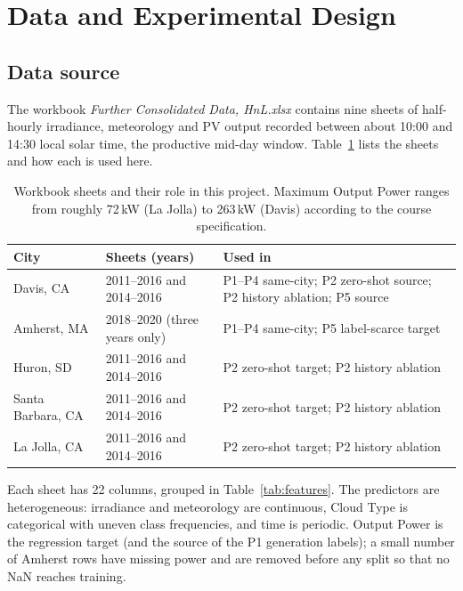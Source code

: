 \documentclass[11pt,letterpaper]{article}
\begin{document}
\section{Data and Experimental Design}
\subsection{Data source}
The workbook \emph{Further Consolidated Data, HnL.xlsx} contains nine sheets of half-hourly
irradiance, meteorology and PV output recorded between about 10:00 and 14:30 local solar time,
the productive mid-day window. Table~\ref{tab:sheets} lists the sheets and
how each is used here.

\begin{table}[!htbp]\centering\footnotesize
\caption{Workbook sheets and their role in this project. Maximum Output Power ranges from roughly 72\,kW (La Jolla) to 263\,kW (Davis) according to the course specification.}\label{tab:sheets}
\setlength{\tabcolsep}{5pt}
\begin{tabularx}{\textwidth}{@{}llX@{}}\toprule
\textbf{City} & \textbf{Sheets (years)} & \textbf{Used in}\\\midrule
Davis, CA & 2011--2016 and 2014--2016 & P1--P4 same-city; P2 zero-shot source; P2 history ablation; P5 source\\
Amherst, MA & 2018--2020 (three years only) & P1--P4 same-city; P5 label-scarce target\\
Huron, SD & 2011--2016 and 2014--2016 & P2 zero-shot target; P2 history ablation\\
Santa Barbara, CA & 2011--2016 and 2014--2016 & P2 zero-shot target; P2 history ablation\\
La Jolla, CA & 2011--2016 and 2014--2016 & P2 zero-shot target; P2 history ablation\\
\bottomrule\end{tabularx}
\end{table}

Each sheet has 22 columns, grouped in Table~\ref{tab:features}. The predictors are heterogeneous:
irradiance and meteorology are continuous, Cloud Type is categorical with uneven class
frequencies, and time is periodic. Output Power is the regression target (and the source of the
P1 generation labels); a small number of Amherst rows have missing power and are removed before
any split so that no NaN reaches training.
\end{document}
